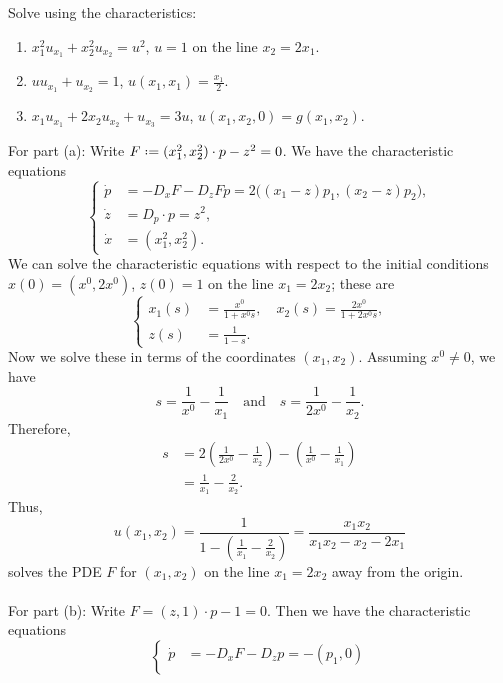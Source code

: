 \begin{problem}
  Solve using the characteristics:
  \begin{enumerate}[label=(\alph*)]
  \item \(x_1^2u_{x_1}+x_2^2u_{x_2}=u^2\), \(u=1\) on the line
    \(x_2=2x_1\).
  \item \(uu_{x_1}+u_{x_2}=1\), \(u(x_1,x_1)=\frac{x_1}{2}\).
  \item \(x_1u_{x_1}+2x_2u_{x_2}+u_{x_3}=3u\),
    \(u(x_1,x_2,0)=g(x_1,x_2)\).
  \end{enumerate}
\end{problem}
\begin{solution*}
  For part (a): Write \(F\defeq (x_1^2,x_2^2)\cdot p-z^2=0\). We have the
  characteristic equations
  \[
    \left\{
      \begin{aligned}
        \dot p&=-D_xF-D_zFp=2\bigl((x_1-z)p_1,(x_2-z)p_2\bigr),\\
        \dot z&=D_p\cdot p=z^2,\\
        \dot x&=(x_1^2,x_2^2).
      \end{aligned}
    \right.
  \]
  We can solve the characteristic equations with respect to the initial
  conditions \(x(0)=(x^0,2x^0)\), \(z(0)=1\) on the line \(x_1=2x_2\);
  these are
  \[
    \left\{
      \begin{aligned}
        x_1(s)&=\frac{x^0}{1+x^0s},\quad
        x_2(s)=\frac{2x^0}{1+2x^0s},\\
        z(s)&=\frac{1}{1-s}.
      \end{aligned}
    \right.
  \]
  Now we solve these in terms of the coordinates \((x_1,x_2)\). Assuming
  \(x^0\neq 0\), we have
  \[
    s=\frac{1}{x^0}-\frac{1}{x_1}\quad
    \text{and}\quad
    s=\frac{1}{2x^0}-\frac{1}{x_2}.
  \]
  Therefore,
  \begin{align*}
    s
    &=2\left(\frac{1}{2x^0}-\frac{1}{x_2}\right)
      -\left(\frac{1}{x^0}-\frac{1}{x_1}\right)\\
    &=\frac{1}{x_1}-\frac{2}{x_2}.
  \end{align*}
  Thus,
  \[
    u(x_1,x_2)=
    \frac{1}{1-\left(\frac{1}{x_1}-\frac{2}{x_2}\right)}=%
    \frac{x_1x_2}{x_1x_2-x_2-2x_1}
  \]
  solves the PDE \(F\) for \((x_1,x_2)\) on the line \(x_1=2x_2\) away from
  the origin.
  \\\\
  For part (b): Write \(F=(z,1)\cdot p-1=0\).  Then we have the
  characteristic equations
  \[
    \left\{
      \begin{aligned}
        \dot p&=-D_xF-D_z p=-(p_1,0)\\

\end{aligned}\]
\end{solution*}
